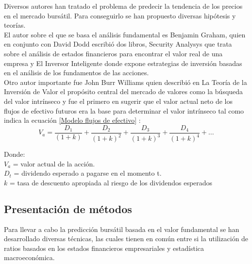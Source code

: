 Diversos autores han tratado el problema de predecir la tendencia de los precios en el mercado bursátil. Para conseguirlo se han propuesto diversas hipótesis y teor\'ias.\\

El autor sobre el que se basa el análisis fundamental es Benjamin Graham, quien en conjunto con David Dodd escribió dos libros, Security Analysys \cite{BenjaminGraham2009} que trata sobre el an\'alisis de estados financieros para encontrar el valor real de una empresa y El Inversor Inteligente \cite{Graham2007} donde expone estrategias de inversi\'on basadas en el an\'alisis de los fundamentos de las acciones.\\

Otro autor importante fue John Burr Williams quien describió en La Teor\'ia de la Inversi\'on de Valor \cite{Williams1938}  el propósito central del mercado de valores como la búsqueda del valor intrínseco y fue el primero en sugerir que el valor actual neto de los flujos de efectivo futuros era la base para determinar el valor intrínseco tal como indica la ecuaci\'on \ref{Modelo flujos de efectivo} \cite{Kolb1993}:\\

\begin{equation}
\label{Modelo flujos de efectivo}
V_a = \frac{D_1}{(1 + k)} + \frac{D_2}{(1 + k)^2} + \frac{D_3}{(1 + k)^3} + \frac{D_4}{(1 + k)^4} + …
\end{equation}

Donde:\\

$V_a$ = valor actual de la acci\'on.\\

$D_t$ = dividendo esperado a pagarse en el momento t.\\

$k$ = tasa de descuento apropiada al riesgo de los dividendos esperados\\

\subsection{Presentación de métodos}

Para llevar a cabo la predicci\'on burs\'atil basada en el valor fundamental se han desarrollado diversas t\'ecnicas, las cuales tienen en com\'un entre si la utilizaci\'on de ratios basados en los estados financieros empresariales y estad\'istica macroecon\'omica.\\

